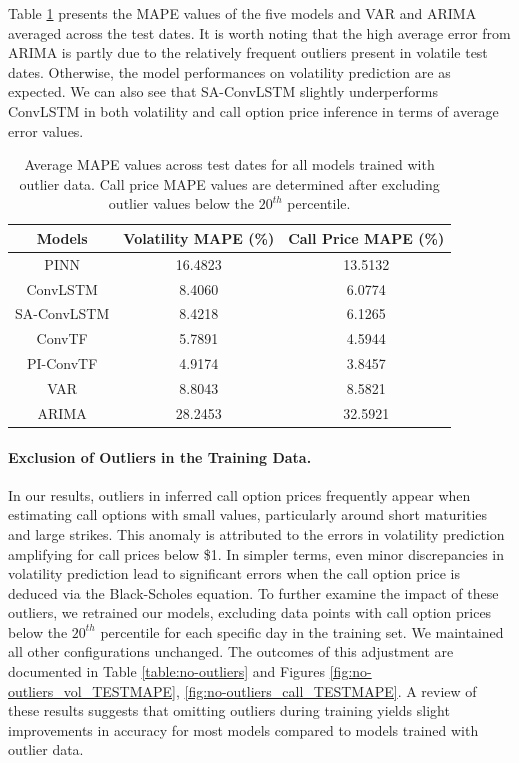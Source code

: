 \documentclass{article}
\begin{document}
Table \ref{table:2} presents the MAPE values of the five models {and VAR} {and ARIMA }averaged across the test dates. It is worth noting that the high average error from ARIMA is partly due to the relatively frequent outliers present in volatile test dates. Otherwise, the model performances on volatility prediction are as expected. We can also see that SA-ConvLSTM slightly underperforms ConvLSTM in both volatility and call option price inference in terms of average error values. 

\begin{table}[htp]
    \centering
    \begin{tabular}{|c c c|}
         \hline
         Models & Volatility MAPE (\%) & Call Price MAPE (\%) \\ 
         \hline\hline
         PINN & 16.4823 & 13.5132 \\
         \hline
         ConvLSTM & 8.4060 & 6.0774 \\
         \hline
         SA-ConvLSTM & 8.4218 & 6.1265 \\
         \hline
         ConvTF & 5.7891 & 4.5944 \\
         \hline
         PI-ConvTF & 4.9174 & 3.8457 \\
         \hline
         VAR & 8.8043 & 8.5821 \\
         \hline
         ARIMA & 28.2453 & 32.5921 \\
         \hline
    \end{tabular}
    \captionsetup{skip=10pt}
    \caption{Average MAPE values across test dates for all models trained with outlier data. Call price MAPE values are determined after excluding outlier values below the $20^{th}$ percentile.}
    \label{table:2}
\end{table}

\paragraph{Exclusion of Outliers in the Training Data.}
In our results, outliers in inferred call option prices frequently appear when estimating call options with small values, particularly around short maturities and large strikes. This anomaly is attributed to the errors in volatility prediction amplifying for call prices below \$1. In simpler terms, even minor discrepancies in volatility prediction lead to significant errors when the call option price is deduced via the Black-Scholes equation. To further examine the impact of these outliers, we retrained our models, excluding data points with call option prices below the  $20^{th}$ percentile for each specific day in the training set. We maintained all other configurations unchanged. The outcomes of this adjustment are documented in Table \ref{table:no-outliers} and Figures \ref{fig:no-outliers_vol_TESTMAPE}, \ref{fig:no-outliers_call_TESTMAPE}. A review of these results suggests that omitting outliers during training yields slight improvements in accuracy for most models compared to models trained with outlier data.
\end{document}
